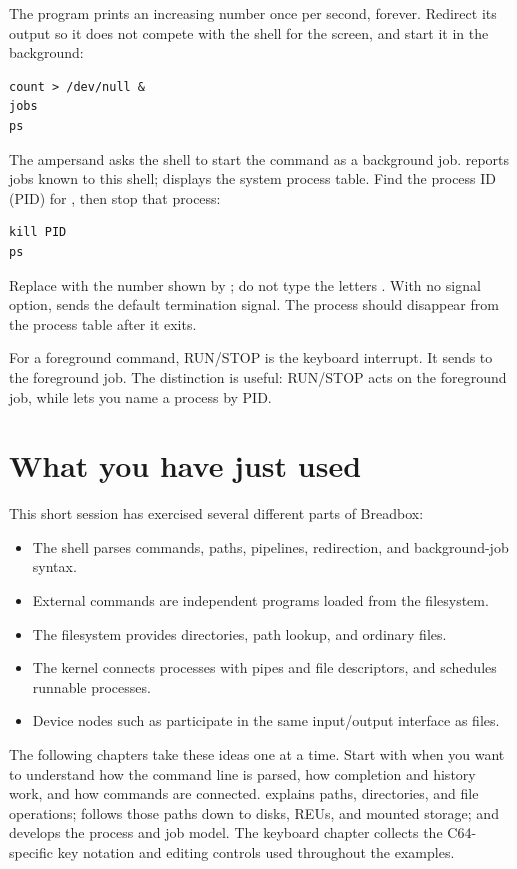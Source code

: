 The  program prints an increasing number once per second, forever. Redirect its output so it does not compete with the shell for the screen, and start it in the background:

\begin{lstlisting}
count > /dev/null &
jobs
ps
\end{lstlisting}

The ampersand asks the shell to start the command as a background job.  reports jobs known to this shell;  displays the system process table. Find the process ID (PID) for , then stop that process:

\begin{lstlisting}
kill PID
ps
\end{lstlisting}

Replace  with the number shown by ; do not type the letters . With no signal option,  sends the default termination signal. The process should disappear from the process table after it exits.

For a foreground command, RUN/STOP is the keyboard interrupt. It sends  to the foreground job. The distinction is useful: RUN/STOP acts on the foreground job, while  lets you name a process by PID.

\section{What you have just used}

This short session has exercised several different parts of Breadbox:

\begin{itemize}
  \item The shell parses commands, paths, pipelines, redirection, and background-job syntax.
  \item External commands are independent programs loaded from the filesystem.
  \item The filesystem provides directories, path lookup, and ordinary files.
  \item The kernel connects processes with pipes and file descriptors, and schedules runnable processes.
  \item Device nodes such as  participate in the same input/output interface as files.
\end{itemize}

The following chapters take these ideas one at a time. Start with  when you want to understand how the command line is parsed, how completion and history work, and how commands are connected.  explains paths, directories, and file operations;  follows those paths down to disks, REUs, and mounted storage; and  develops the process and job model. The keyboard chapter collects the C64-specific key notation and editing controls used throughout the examples.


